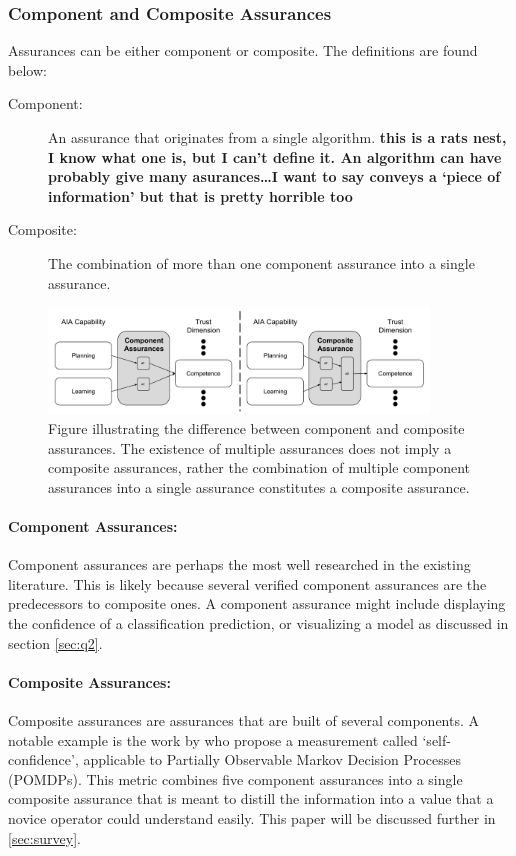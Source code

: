 \subsubsection{Component and Composite Assurances}
Assurances can be either component or composite. The definitions are found below:

\begin{description}
    \item [Component:] An assurance that originates from a single algorithm. \textbf{this is a rats nest, I know what one is, but I can't define it. An algorithm can have probably give many asurances\ldots I want to say conveys a `piece of information' but that is pretty horrible too}
    \item [Composite:] The combination of more than one component assurance into a single assurance. 
\end{description}

\begin{figure}[!htbp]
    \centering
    \includegraphics[width=0.9\textwidth]{Figures/Assurance_component_composite.pdf}
    \caption{Figure illustrating the difference between component and composite assurances. The existence of multiple assurances does not imply a composite assurances, rather the combination of multiple component assurances into a single assurance constitutes a composite assurance.}
    \label{fig:assurance_mapping}
\end{figure}

\paragraph{Component Assurances:} Component assurances are perhaps the most well researched in the existing literature. This is likely because several verified component assurances are the predecessors to composite ones. A component assurance might include displaying the confidence of a classification prediction, or visualizing a model as discussed in section \ref{sec:q2}.

\paragraph{Composite Assurances:} Composite assurances are assurances that are built of several components. A notable example is the work by \citet{Aitken2016-cv} who propose a measurement called `self-confidence', applicable to Partially Observable Markov Decision Processes (POMDPs). This metric combines five component assurances into a single composite assurance that is meant to distill the information into a value that a novice operator could understand easily. This paper will be discussed further in \ref{sec:survey}. 

